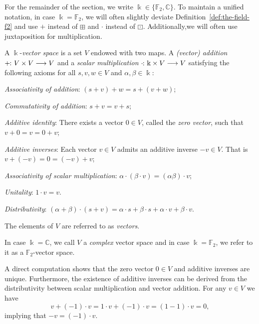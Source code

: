 \documentclass[a4paper, oneside, 12pt]{amsart}
\begin{document}
\begin{convention}
  For the remainder of the section, we write \(\Bbbk\in\{ \mathbb{F}_{2}, \mathbb{C}\}\).
  To maintain a unified notation, in case \( \Bbbk= \mathbb{F}_{2}\), we will often slightly deviate Definition~\ref{def:the-field-f2} and  use \(+\) instead of \(\boxplus\) and \(\cdot\) instead of \(\boxdot\).
  Additionally,we will often use juxtaposition for  multiplication.
\end{convention}

\begin{definition}\label{def:complex-vector-space}
  A \(\Bbbk\)-\emph{vector space} is a set \( V \) endowed with two maps.
  A \emph{(vector) addition} \( +\from V \times V \to V \) and a \emph{scalar multiplication} \( \cdot\from \Bbbk \times V \to V \) satisfying the following axioms for all \( s, v, w \in V \) and \( \alpha, \beta \in \Bbbk \):

  \begin{thmlist}
    \item \emph{Associativity of addition}: \( (s + v) + w = s + (v + w) \);
    \item \emph{Commutativity of  addition}: \( s + v = v + s \);
    \item \emph{Additive identity}: There exists a vector \( 0 \in V \), called the \emph{zero vector},  such that \( v + 0 = v = 0 + v \);
    \item \emph{Additive inverses}: Each vector \( v \in V \) admits an additive inverse \(-v \in V\). That is \( v + (-v) = 0 = (-v) + v \);
    \item \emph{Associativity of scalar multiplication}: \( \alpha \cdot (\beta \cdot v) = (\alpha \beta) \cdot v \);
    \item \emph{Unitality}: \( 1 \cdot v = v \).
    \item \emph{Distributivity}: \( (\alpha + \beta) \cdot (s + v) = \alpha \cdot s + \beta \cdot s + \alpha \cdot v + \beta \cdot v\).
  \end{thmlist}
  The elements of \(V\) are referred to as \emph{vectors}.

  In case \(  \Bbbk= \mathbb{C}\), we call \(V\) a \emph{complex} vector space and in case \(  \Bbbk= \mathbb{F}_{2}\), we refer to it as a \( \mathbb{F}_{2}\)-vector space.
\end{definition}

A direct computation shows that the zero vector \( 0 \in V \) and additive inverses are unique.
Furthermore, the existence of additive inverses can be derived from  the distributivity between scalar multiplication and vector addition.
For any \(v\in V\) we have
\begin{equation*}
  v + (-1)\cdot v = 1\cdot v + (-1) \cdot v = (1 -1) \cdot v = 0,
\end{equation*}
implying that \(-v = (-1)\cdot v\).
\end{document}

